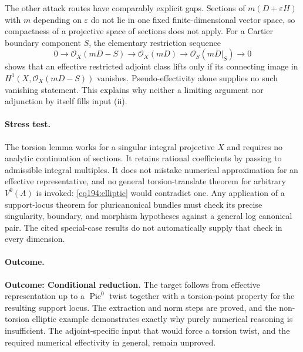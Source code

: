 \documentclass[11pt,a4paper]{article}
\numberwithin{equation}{section}
\begin{document}
The other attack routes have comparably explicit gaps. Sections of $m(D+\varepsilon H)$ with $m$ depending on $\varepsilon$ do not lie in one fixed finite-dimensional vector space, so compactness of a projective space of sections does not apply. For a Cartier boundary component $S$, the elementary restriction sequence
\[
 0\longrightarrow\mathcal O_X(mD-S)\longrightarrow\mathcal O_X(mD)
 \longrightarrow\mathcal O_S(mD|_S)\longrightarrow0
\]
shows that an effective restricted adjoint class lifts only if its connecting image in $H^1(X,\mathcal O_X(mD-S))$ vanishes. Pseudo-effectivity alone supplies no such vanishing statement. This explains why neither a limiting argument nor adjunction by itself fills input (ii).

\paragraph{Stress test.}
The torsion lemma works for a singular integral projective $X$ and requires no analytic continuation of sections. It retains rational coefficients by passing to admissible integral multiples. It does not mistake numerical approximation for an effective representative, and no general torsion-translate theorem for arbitrary $V^0(A)$ is invoked: \eqref{eq194:elliptic} would contradict one. Any application of a support-locus theorem for pluricanonical bundles must check its precise singularity, boundary, and morphism hypotheses against a general log canonical pair. The cited special-case results do not automatically supply that check in every dimension.

\paragraph{Outcome.}
\textbf{Outcome: Conditional reduction.}
The target follows from effective representation up to a $\operatorname{Pic}^0$ twist together with a torsion-point property for the resulting support locus. The extraction and norm steps are proved, and the non-torsion elliptic example demonstrates exactly why purely numerical reasoning is insufficient. The adjoint-specific input that would force a torsion twist, and the required numerical effectivity in general, remain unproved.

\end{document}

